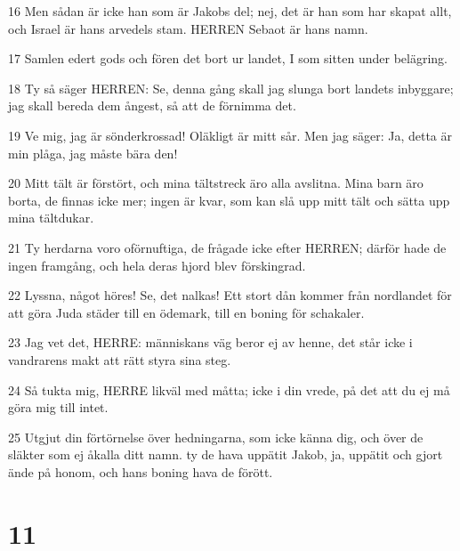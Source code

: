 \par 16 Men sådan är icke han som är Jakobs del; nej, det är han som har skapat allt, och Israel är hans arvedels stam. HERREN Sebaot är hans namn.
\par 17 Samlen edert gods och fören det bort ur landet, I som sitten under belägring.
\par 18 Ty så säger HERREN: Se, denna gång skall jag slunga bort landets inbyggare; jag skall bereda dem ångest, så att de förnimma det.
\par 19 Ve mig, jag är sönderkrossad! Oläkligt är mitt sår. Men jag säger: Ja, detta är min plåga, jag måste bära den!
\par 20 Mitt tält är förstört, och mina tältstreck äro alla avslitna. Mina barn äro borta, de finnas icke mer; ingen är kvar, som kan slå upp mitt tält och sätta upp mina tältdukar.
\par 21 Ty herdarna voro oförnuftiga, de frågade icke efter HERREN; därför hade de ingen framgång, och hela deras hjord blev förskingrad.
\par 22 Lyssna, något höres! Se, det nalkas! Ett stort dån kommer från nordlandet för att göra Juda städer till en ödemark, till en boning för schakaler.
\par 23 Jag vet det, HERRE: människans väg beror ej av henne, det står icke i vandrarens makt att rätt styra sina steg.
\par 24 Så tukta mig, HERRE likväl med måtta; icke i din vrede, på det att du ej må göra mig till intet.
\par 25 Utgjut din förtörnelse över hedningarna, som icke känna dig, och över de släkter som ej åkalla ditt namn. ty de hava uppätit Jakob, ja, uppätit och gjort ände på honom, och hans boning hava de förött.

\chapter{11}


